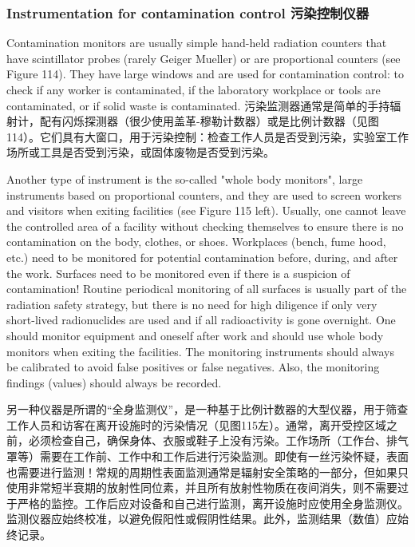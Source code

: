 \documentclass[dvipsnames, svgnames,a4paper,11pt]{article}
\begin{document}
\subsubsection{Instrumentation for contamination control 污染控制仪器}  
Contamination monitors are usually simple hand-held radiation counters that have scintillator probes (rarely Geiger Mueller) or are proportional counters (see Figure 114). They have large windows and are used for contamination control: to check if any worker is contaminated, if the laboratory workplace or tools are contaminated, or if solid waste is contaminated.  
污染监测器通常是简单的手持辐射计，配有闪烁探测器（很少使用盖革-穆勒计数器）或是比例计数器（见图114）。它们具有大窗口，用于污染控制：检查工作人员是否受到污染，实验室工作场所或工具是否受到污染，或固体废物是否受到污染。  

Another type of instrument is the so-called "whole body monitors", large instruments based on proportional counters, and they are used to screen workers and visitors when exiting facilities (see Figure 115 left). Usually, one cannot leave the controlled area of a facility without checking themselves to ensure there is no contamination on the body, clothes, or shoes. Workplaces (bench, fume hood, etc.) need to be monitored for potential contamination before, during, and after the work. Surfaces need to be monitored even if there is a suspicion of contamination! Routine periodical monitoring of all surfaces is usually part of the radiation safety strategy, but there is no need for high diligence if only very short-lived radionuclides are used and if all radioactivity is gone overnight. One should monitor equipment and oneself after work and should use whole body monitors when exiting the facilities. The monitoring instruments should always be calibrated to avoid false positives or false negatives. Also, the monitoring findings (values) should always be recorded.  

另一种仪器是所谓的“全身监测仪”，是一种基于比例计数器的大型仪器，用于筛查工作人员和访客在离开设施时的污染情况（见图115左）。通常，离开受控区域之前，必须检查自己，确保身体、衣服或鞋子上没有污染。工作场所（工作台、排气罩等）需要在工作前、工作中和工作后进行污染监测。即使有一丝污染怀疑，表面也需要进行监测！常规的周期性表面监测通常是辐射安全策略的一部分，但如果只使用非常短半衰期的放射性同位素，并且所有放射性物质在夜间消失，则不需要过于严格的监控。工作后应对设备和自己进行监测，离开设施时应使用全身监测仪。监测仪器应始终校准，以避免假阳性或假阴性结果。此外，监测结果（数值）应始终记录。  
\end{document}
